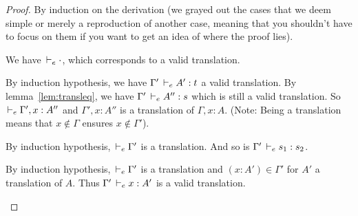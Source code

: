 \documentclass[a4paper,english]{lipics-utf8x}
\begin{document}
  \begin{proof}
    By induction on the derivation (we grayed out the cases that we deem
    simple or merely a reproduction of another case, meaning that you shouldn't
    have to focus on them if you want to get an idea of where the proof lies).

    \leavevmode
    \begin{caselist}
      \begin{graycase}
        \begin{mathc}
          \ru{}{\derr \cdot}
        \end{mathc}
        We have $\,\vdash_e \cdot$, which corresponds to a valid translation.
      \end{graycase}

      \begin{graycase}
        \begin{mathc}
        \end{mathc}
        By induction hypothesis, we have $\Gamma' \,\vdash_e A' : t$ a valid
        translation. By lemma~\ref{lem:transleq}, we have
        $\Gamma' \,\vdash_e A'' : s$ which is still a valid translation.
        So $\,\vdash_e \Gamma', x : A''$ and $\Gamma', x : A''$ is a translation of
        $\Gamma, x : A$.
        (Note: Being a translation means that $x \notin \Gamma$ ensures
        $x \notin \Gamma'$).
      \end{graycase}

      \begin{graycase}
        \begin{mathc}
        \end{mathc}
        By induction hypothesis, $\,\vdash_e \Gamma'$ is a translation.
        And so is $\Gamma' \,\vdash_e s_1 : s_2$.
      \end{graycase}

      \begin{graycase}
        \begin{mathc}
        \end{mathc}
        By induction hypothesis, $\,\vdash_e \Gamma'$ is a translation and
        $(x : A') \in \Gamma'$ for $A'$ a translation of $A$.
        Thus $\Gamma' \,\vdash_e x : A'$ is a valid translation.
      \end{graycase}


\end{caselist}
\end{proof}
\end{document}

